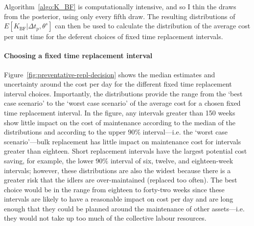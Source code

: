 Algorithm~\ref{algo:K_BF} is computationally intensive, and so I thin the draws from the posterior, using only every fifth draw. The resulting distributions of $E[K_{\text{BF}}|\Delta t_p,\theta^s]$ can then be used to calculate the distribution of the average cost per unit time for the deferent choices of fixed time replacement intervals.

\paragraph*{Choosing a fixed time replacement interval}

Figure~\ref{fig:preventative-repl-decision} shows the median estimates and uncertainty around the cost per day for the different fixed time replacement interval choices. Importantly, the distributions provide the range from the `best case scenario' to the `worst case scenario' of the average cost for a chosen fixed time replacement interval. In the figure, any intervals greater than 150 weeks show little impact on the cost of maintenance according to the median of the distributions and according to the upper $90\%$ interval---i.e. the `worst case scenario'---bulk replacement has little impact on maintenance cost for intervals greater than eighteen. Short replacement intervals have the largest potential cost saving, for example, the lower $90\%$ interval of six, twelve, and eighteen-week intervals; however, these distributions are also the widest because there is a greater risk that the idlers are over-maintained (replaced too often). The best choice would be in the range from eighteen to forty-two weeks since these intervals are likely to have a reasonable impact on cost per day and are long enough that they could be planned around the maintenance of other assets---i.e. they would not take up too much of the collective labour resources.

